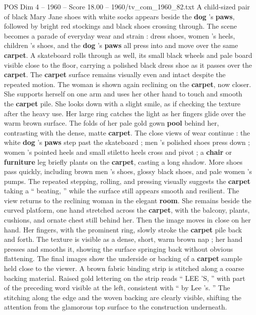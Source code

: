 \begin{textsample}{POS Dim 4 – 1960 – Score 18.00 – 1960/tv\_com\_1960\_82.txt}
A child-sized pair of black Mary Jane shoes with white socks appears beside the \textbf{dog} ’s \textbf{paws}, followed by bright red stockings and black shoes crossing through.
The scene becomes a parade of everyday wear and strain : dress shoes, women ’s heels, children ’s shoes, and the \textbf{dog} ’s \textbf{paws} all press into and move over the same \textbf{carpet}.
A skateboard rolls through as well, its small black wheels and pale board visible close to the floor, carrying a polished black dress shoe as it passes over the \textbf{carpet}.
The \textbf{carpet} surface remains visually even and intact despite the repeated motion.
The woman is shown again reclining on the \textbf{carpet}, now closer.
She supports herself on one arm and uses her other hand to touch and smooth the \textbf{carpet} pile.
She looks down with a slight smile, as if checking the texture after the heavy use.
Her large ring catches the light as her fingers glide over the warm brown surface.
The folds of her pale gold gown \textbf{pool} behind her, contrasting with the dense, matte \textbf{carpet}.
The close views of wear continue : the white \textbf{dog} ’s \textbf{paws} step past the skateboard ; men ’s polished shoes press down ; women ’s pointed heels and small stiletto heels cross and pivot ; a \textbf{chair} or \textbf{furniture} leg briefly plants on the \textbf{carpet}, casting a long shadow.
More shoes pass quickly, including brown men ’s shoes, glossy black shoes, and pale women ’s pumps.
The repeated stepping, rolling, and pressing visually suggests the \textbf{carpet} taking a “ beating, ” while the surface still appears smooth and resilient.
The view returns to the reclining woman in the elegant \textbf{room}.
She remains beside the curved platform, one hand stretched across the \textbf{carpet}, with the balcony, plants, cushions, and ornate chest still behind her.
Then the image moves in close on her hand.
Her fingers, with the prominent ring, slowly stroke the \textbf{carpet} pile back and forth.
The texture is visible as a dense, short, warm brown nap ; her hand presses and smooths it, showing the surface springing back without obvious flattening.
The final images show the underside or backing of a \textbf{carpet} sample held close to the viewer.
A brown fabric binding strip is stitched along a coarse backing material.
Raised gold lettering on the strip reads “ LEE ’S, ” with part of the preceding word visible at the left, consistent with “ by Lee ’s. ” The stitching along the edge and the woven backing are clearly visible, shifting the attention from the glamorous top surface to the construction underneath.

\end{textsample}
